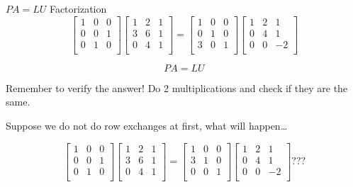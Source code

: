 \documentclass{beamer}
\begin{document}
\begin{frame}{$PA=LU$ Factorization}
\begin{equation*}
    \left[ \begin{matrix}
        1&		0&		0\\
        0&		0&		1\\
        0&		1&		0\\
    \end{matrix} \right] \left[ \begin{matrix}
        1&		2&		1\\
        3&		6&		1\\
        0&		4&		1\\
    \end{matrix} \right] =\left[ \begin{matrix}
        1&		0&		0\\
        0&		1&		0\\
        3&		0&		1\\
    \end{matrix} \right] \left[ \begin{matrix}
        1&		2&		1\\
        0&		4&		1\\
        0&		0&		-2\\
    \end{matrix} \right]
\end{equation*}

\begin{equation*}
    PA=LU
\end{equation*}

Remember to verify the answer! Do 2 multiplications and check if they are the same.

Suppose we do not do row exchanges at first, what will happen\dots

\begin{equation*}
    \left[ \begin{matrix}
        1&		0&		0\\
        0&		0&		1\\
        0&		1&		0\\
    \end{matrix} \right] \left[ \begin{matrix}
        1&		2&		1\\
        3&		6&		1\\
        0&		4&		1\\
    \end{matrix} \right] =\left[ \begin{matrix}
        1&		0&		0\\
        3&		1&		0\\
        0&		0&		1\\
    \end{matrix} \right] \left[ \begin{matrix}
        1&		2&		1\\
        0&		4&		1\\
        0&		0&		-2\\
    \end{matrix} \right] ???
\end{equation*}


\end{frame}
\end{document}
